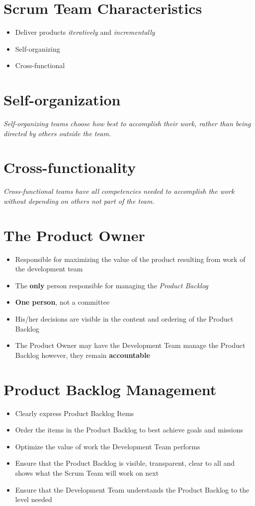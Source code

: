 \documentclass[a4paper,11pt,twocolumn]{article}
\begin{document}
\section*{Scrum Team Characteristics}
\begin{itemize}
	\item Deliver products \textit{iteratively} and \textit{incrementally}
	\item Self-organizing
	\item Cross-functional
\end{itemize}

\section*{Self-organization}
\textit{Self-organizing teams choose how best to accomplish their work, rather than being directed by others outside the team.}

\section*{Cross-functionality}
\textit{Cross-functional teams have all competencies needed to accomplish the work without depending on others not part of the team.}

\section*{The Product Owner}
\begin{itemize}
    \item Responsible for maximizing the value of the product resulting from work of the development team
    \item The \textbf{only} person responsible for managing the \textit{Product Backlog}
	\item \textbf{One person}, not a committee
	\item His/her decisions are visible in the content and ordering of the Product Backlog
	\item The Product Owner may have the Development Team manage the Product Backlog however, they remain \textbf{accountable}
\end{itemize}

\section*{Product Backlog Management}
\begin{itemize}
    \item Clearly express Product Backlog Items
    \item Order the items in the Product Backlog to best achieve goals and missions
    \item Optimize the value of work the Development Team performs
    \item Ensure that the Product Backlog is visible, transparent, clear to all and shows what the Scrum Team will work on next
    \item Ensure that the Development Team understands the Product Backlog to the level needed
\end{itemize}
\end{document}
